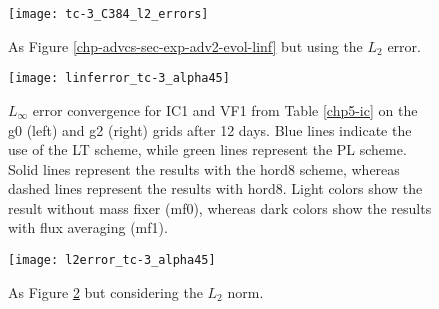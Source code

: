\begin{figure}[!htb]
		\centering
		\texttt{[image: tc-3\_C384\_l2\_errors]}
		\caption{As Figure \ref{chp-advcs-sec-exp-adv2-evol-linf} but using the $L_2$ error.\label{chp-advcs-sec-exp-adv2-evol-l2}}
\end{figure}

\newpage
\begin{figure}[!htb]
	\centering
	\texttt{[image: linferror\_tc-3\_alpha45]}
	\caption{
$L_{\infty}$ error convergence for IC1 and VF1 from Table \ref{chp5-ic} on the g0 (left) and g2 (right) grids after 12 days.
Blue lines indicate the use of the LT scheme, while green lines represent the PL scheme.
Solid lines represent the results with the hord8 scheme, whereas dashed lines represent the results with hord8.
Light colors show the result without mass fixer (mf0), whereas dark colors show the results with flux averaging (mf1).\label{chp-advcs-sec-exp-adv2-linf}}
\end{figure}

\begin{figure}[!htb]
	\centering
	\texttt{[image: l2error\_tc-3\_alpha45]}
	\caption{As Figure \ref{chp-advcs-sec-exp-adv2-linf} but considering the $L_2$ norm. \label{chp-advcs-sec-exp-adv2-error}}
\end{figure}

\newpage
